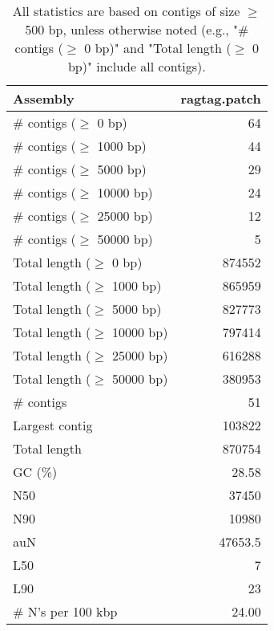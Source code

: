 \documentclass[12pt,a4paper]{article}
\begin{document}
\begin{table}[ht]
\begin{center}
\caption{All statistics are based on contigs of size $\geq$ 500 bp, unless otherwise noted (e.g., "\# contigs ($\geq$ 0 bp)" and "Total length ($\geq$ 0 bp)" include all contigs).}
\begin{tabular}{|l*{1}{|r}|}
\hline
Assembly & ragtag.patch \\ \hline
\# contigs ($\geq$ 0 bp) & 64 \\ \hline
\# contigs ($\geq$ 1000 bp) & 44 \\ \hline
\# contigs ($\geq$ 5000 bp) & 29 \\ \hline
\# contigs ($\geq$ 10000 bp) & 24 \\ \hline
\# contigs ($\geq$ 25000 bp) & 12 \\ \hline
\# contigs ($\geq$ 50000 bp) & 5 \\ \hline
Total length ($\geq$ 0 bp) & 874552 \\ \hline
Total length ($\geq$ 1000 bp) & 865959 \\ \hline
Total length ($\geq$ 5000 bp) & 827773 \\ \hline
Total length ($\geq$ 10000 bp) & 797414 \\ \hline
Total length ($\geq$ 25000 bp) & 616288 \\ \hline
Total length ($\geq$ 50000 bp) & 380953 \\ \hline
\# contigs & 51 \\ \hline
Largest contig & 103822 \\ \hline
Total length & 870754 \\ \hline
GC (\%) & 28.58 \\ \hline
N50 & 37450 \\ \hline
N90 & 10980 \\ \hline
auN & 47653.5 \\ \hline
L50 & 7 \\ \hline
L90 & 23 \\ \hline
\# N's per 100 kbp & 24.00 \\ \hline
\end{tabular}
\end{center}
\end{table}
\end{document}
